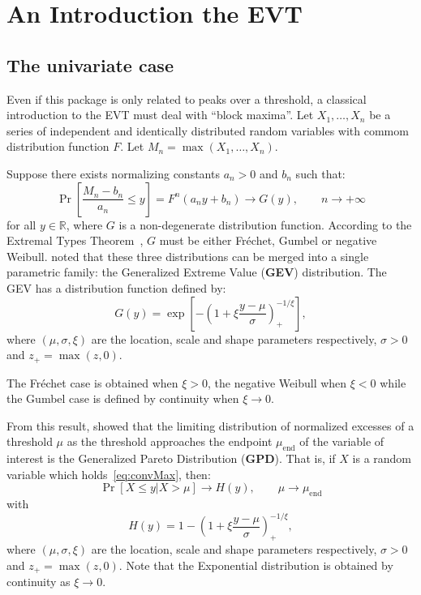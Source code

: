 \documentclass[11pt,a4paper]{article}
\numberwithin{equation}{section}
\theoremstyle{definition}
\begin{document}
\section{An Introduction the EVT}
\label{sec:introEVT}

\subsection{The univariate case}
\label{subsec:univ}

Even if this package is only related to peaks over a threshold, a
classical introduction to the EVT must deal with ``block maxima''. Let
$X_1,\ldots,X_n$ be a series of independent and identically distributed
random variables with commom distribution function $F$. Let $M_n =
\max(X_1,\ldots,X_n)$.

Suppose there exists normalizing constants $a_n>0$ and $b_n$ such
that:
\begin{equation}
  \label{eq:convMax}
  \Pr\left[\frac{M_n - b_n}{a_n} \leq y \right] = F^n(a_ny+b_n)
  \longrightarrow G(y), \qquad n \rightarrow +\infty
\end{equation}
for all $y \in \mathbb{R}$, where $G$ is a non-degenerate distribution
function. According to the Extremal Types Theorem~\citep{Fisher1928},
$G$ must be either Fr\'echet, Gumbel or negative
Weibull. \citet{Jenkinson1955} noted that these three distributions can
be merged into a single parametric family: the Generalized Extreme
Value (\textbf{GEV}) distribution. The GEV has a distribution function
defined by:
\begin{equation}
  \label{eq:GEV}
  G(y) = \exp\left[ -\left( 1 + \xi \frac{y-\mu}{\sigma}
    \right)_+^{-1/\xi} \right],
\end{equation}
where $(\mu,\sigma,\xi)$ are the location, scale and shape parameters
respectively, $\sigma>0$ and $z_+=\max(z,0)$.

The Fr\'echet case is obtained when $\xi>0$, the negative Weibull when
$\xi<0$ while the Gumbel case is defined by continuity when
$\xi\rightarrow0$.

From this result, \citet{Pickands1975} showed that the limiting
distribution of normalized excesses of a threshold $\mu$ as the
threshold approaches the endpoint $\mu_\mathrm{end}$ of the variable
of interest is the Generalized Pareto Distribution
(\textbf{GPD}). That is, if $X$ is a random variable which
holds~\eqref{eq:convMax}, then:
\begin{equation}
  \label{eq:convExcess}
  \Pr\left[X \leq y | X > \mu \right] \longrightarrow H(y), \qquad \mu
    \rightarrow \mu_\mathrm{end}
\end{equation}
with
\begin{equation}
  \label{eq:GPD}
  H(y) = 1 - \left(1 + \xi\frac{y-\mu}{\sigma}\right)_+^{-1/\xi},
\end{equation}
where $(\mu,\sigma,\xi)$ are the location, scale and shape parameters
respectively, $\sigma>0$ and $z_+=\max(z,0)$. Note that the
Exponential distribution is obtained by continuity as $\xi \rightarrow
0$.
\end{document}
